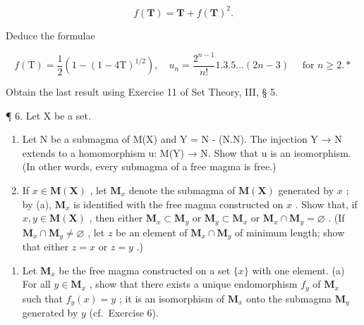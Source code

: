 \[
f (\mathbf {T}) = \mathbf {T} + f (\mathbf {T}) ^ {2}.
\]

Deduce the formulae

\[
f (\mathrm{T}) = \frac {1}{2} (1 - (1 - 4 \mathrm{T}) ^ {1 / 2}), \quad u _ {n} = \frac {2 ^ {n - 1}}{n !} 1. 3. 5 \dots (2 n - 3) \quad \text { for } n \geqslant 2. *
\]

Obtain the last result using Exercise 11 of Set Theory, III, § 5.

¶ 6. Let X be a set.

\begin{enumerate}
\def\labelenumi{(\alph{enumi})}
\item
  Let N be a submagma of M(X) and Y = N - (N.N). The injection Y → N extends to a homomorphism u: M(Y) → N. Show that u is an isomorphism. (In other words, every submagma of a free magma is free.)
\item
  If \(x \in \mathbf{M}(\mathbf{X})\) , let \(\mathbf{M}_x\) denote the submagma of \(\mathbf{M}(\mathbf{X})\) generated by \(x\) ; by (a), \(\mathbf{M}_x\) is identified with the free magma constructed on \(x\) . Show that, if \(x, y \in \mathbf{M}(\mathbf{X})\) , then either \(\mathbf{M}_x \subset \mathbf{M}_y\) or \(\mathbf{M}_y \subset \mathbf{M}_x\) or \(\mathbf{M}_x \cap \mathbf{M}_y = \varnothing\) . (If \(\mathbf{M}_x \cap \mathbf{M}_y \neq \varnothing\) , let \(z\) be an element of \(\mathbf{M}_x \cap \mathbf{M}_y\) of minimum length; show that either \(z = x\) or \(z = y\) .)
\end{enumerate}

\begin{enumerate}
\def\labelenumi{\arabic{enumi}.}
\setcounter{enumi}{6}
\tightlist
\item
  Let \(\mathbf{M}_x\) be the free magma constructed on a set \(\{x\}\) with one element. (a) For all \(y \in \mathbf{M}_x\) , show that there exists a unique endomorphism \(f_y\) of \(\mathbf{M}_x\) such that \(f_y(x) = y\) ; it is an isomorphism of \(\mathbf{M}_x\) onto the submagma \(\mathbf{M}_y\) generated by \(y\) (cf.~Exercise 6).
\end{enumerate}

